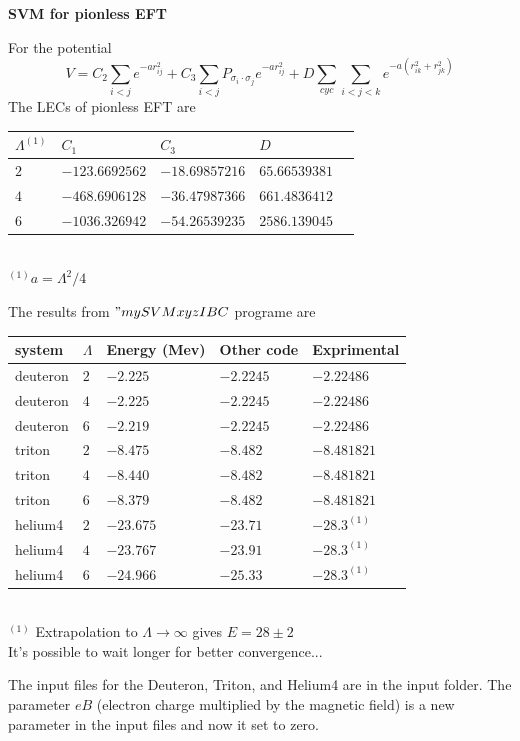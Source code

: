 \documentclass[11pt]{article}
\begin{document}
    \begin{center}
        \vspace*{1cm}        
        \Large
        \textbf{SVM for pionless EFT}
        \vspace{0.5cm}
        \LARGE               
    \end{center}

For the potential
$$V=C_2\sum_{i<j}e^{-ar_{ij}^2}+C_3\sum_{i<j}P_{\sigma_i\cdot \sigma_j} e^{-ar_{ij}^2}+D\sum_{cyc} \sum_{i<j<k} e^{-a(r_{ik}^2+r_{jk}^2)}$$
The LECs of pionless EFT are 
\begin{center}
\begin{tabular}{| l | l | l | l | l |}
\hline
$\Lambda^{(1)}$ & $C_1$ & $C_3$  & $D$  \\ \hline
 $2$ & $-123.6692562$ & $-18.69857216$ &  $65.66539381$   \\ \hline
 $4$ & $-468.6906128$ & $-36.47987366$ &  $661.4836412$   \\ \hline
 $6$ & $-1036.326942$ & $-54.26539235$ &  $2586.139045$   \\ \hline
\end{tabular}
\\ $^{(1)} a=\Lambda^2/4$
\end{center}
The results from $"mySVMxyzIBC$ programe are
\begin{center}
\begin{tabular}{| l | l | l | l | l |}
\hline
system & $\Lambda$ & Energy (Mev) & Other code &Exprimental \\ \hline
deuteron    & $2$ & $-2.225$   & $-2.2245$ & $-2.22486$     \\ \hline
deuteron    & $4$ & $-2.225$   & $-2.2245$ & $-2.22486$     \\ \hline
deuteron    & $6$ & $-2.219$   & $-2.2245$ & $-2.22486$     \\ \hline
triton      & $2$ & $-8.475$   & $-8.482$ & $-8.481821$    \\ \hline
triton      & $4$ & $-8.440$   & $-8.482$ & $-8.481821$    \\ \hline
triton      & $6$ & $-8.379$   & $-8.482$ & $-8.481821$    \\ \hline
helium4     & $2$ & $-23.675$   & $-23.71$       & $-28.3^{(1)}$  \\ \hline
helium4     & $4$ & $-23.767$   & $-23.91$       & $-28.3^{(1)}$  \\ \hline
helium4     & $6$ & $-24.966$   & $-25.33$       & $-28.3^{(1)}$  \\ \hline
\end{tabular}
\\$^{(1)}$ Extrapolation to $\Lambda \rightarrow \infty$ gives $E=28\pm2$
\\It's possible to wait longer for better convergence...
\end{center}
The input files for the Deuteron, Triton, and Helium4 are in the input folder. 
The parameter $eB$ (electron charge multiplied by the magnetic field) is a new parameter in the input files and now it set to zero.
\end{document}
